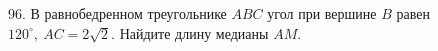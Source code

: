 96. В равнобедренном треугольнике $ABC$ угол при вершине $B$ равен $120^\circ,\ AC=2\sqrt{2}.$ Найдите длину медианы $AM.$\\
